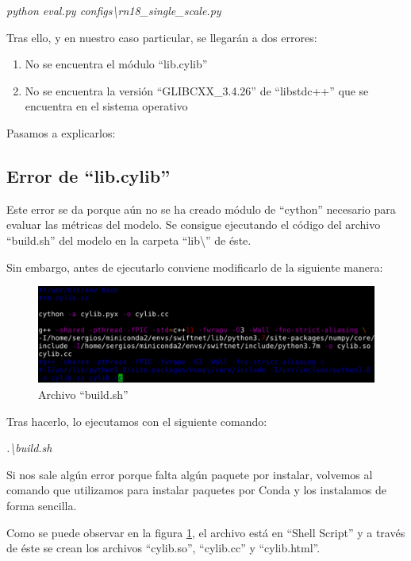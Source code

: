 \begin{center}
\textit{python eval.py configs\textbackslash{rn18\_single\_scale.py}}
\end{center}

Tras ello, y en nuestro caso particular, se llegarán a dos errores:

\begin{enumerate}
\item No se encuentra el módulo ``lib.cylib''
\item No se encuentra la versión ``GLIBCXX\_3.4.26'' de ``libstdc++'' que se encuentra en el sistema operativo
\end{enumerate}

Pasamos a explicarlos:

\subsection{Error de ``lib.cylib''}

Este error se da porque aún no se ha creado módulo de ``cython'' \cite{cython} necesario para evaluar las métricas del modelo. Se consigue ejecutando el código del archivo ``build.sh'' del modelo en la carpeta ``lib\textbackslash{}'' de éste.

Sin embargo, antes de ejecutarlo conviene modificarlo de la siguiente manera:

\begin{figure}[H]
  \centering
  \includegraphics[width=12cm]{Figuras/cylib.eps}
  \caption{Archivo ``build.sh''}
  \label{fig:cylib}
\end{figure}

Tras hacerlo, lo ejecutamos con el siguiente comando:

\begin{center}
\textit{.\textbackslash{build.sh}}
\end{center}

Si nos sale algún error porque falta algún paquete por instalar, volvemos al comando que utilizamos para instalar paquetes por Conda y los instalamos de forma sencilla.

Como se puede observar en la figura \ref{fig:cylib}, el archivo está en ``Shell Script'' \cite{shell} y a través de éste se crean los archivos ``cylib.so'', ``cylib.cc'' y ``cylib.html''.

